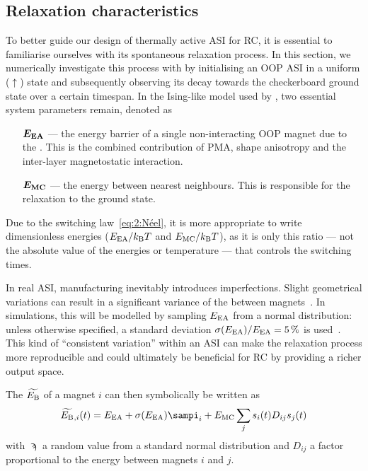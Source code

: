 \subsection{Relaxation characteristics}\label{sec:3:relaxation}
To better guide our design of thermally active ASI for RC, it is essential to familiarise ourselves with its spontaneous relaxation process.
In this section, we numerically investigate this process with \hotspice by initialising an OOP ASI in a uniform ($\uparrow$) state and subsequently observing its decay towards the checkerboard ground state over a certain timespan.
In the Ising-like model used by \hotspice, two essential system parameters remain, denoted as
\begin{itemize}[leftmargin=4.1em]
	\item[$\boldsymbol{E_\mathrm{EA}}$ ---] the energy barrier of a single non-interacting OOP magnet due to the .
	This is the combined contribution of PMA, shape anisotropy and the inter-layer magnetostatic interaction.
	\item[$\boldsymbol{E_\mathrm{MC}}$ ---] the  energy between nearest neighbours.
	This is responsible for the relaxation to the ground state.
\end{itemize}
Due to the  switching law~\eqref{eq:2:Néel}, it is more appropriate to write dimensionless energies ($\EEA/\kBT$ and $\EMC/\kBT$), as it is only this ratio --- not the absolute value of the energies or temperature --- that controls the switching times. \par
In real ASI, manufacturing inevitably introduces imperfections.
Slight geometrical variations can result in a significant variance of the  between magnets~\cite{Budrikis2012,DisorderGroundStateASI}.
In simulations, this will be modelled by sampling $E_\mathrm{EA}$ from a normal distribution: unless otherwise specified, a standard deviation $\sigma(E_\mathrm{EA})/E_\mathrm{EA} = \SI{5}{\percent}$ is used~\cite{Farhan2013}.
This kind of ``consistent variation'' within an ASI can make the relaxation process more reproducible and could ultimately be beneficial for RC by providing a richer output space. \par
The  $\widetilde{E_\mathrm{B}}$ of a magnet $i$ can then symbolically be written as
\begin{equation}
	\label{eq:3:OOP_relaxation_EBeff}
	\EBeff{}_{,i}(t) = \EEA + \sigma(\EEA) \sampi_i + \EMC \sum_j s_i(t) D_{ij} s_j(t)
\end{equation}
with $\sampi$ a random value from a standard normal distribution and $D_{ij}$ a factor proportional to the  energy between magnets $i$ and $j$. \\\par

